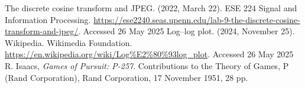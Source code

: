 \documentclass[11pt, twocolumn]{article}
\begin{document}
          \begin{thebibliography}{99}
             The discrete cosine transform and JPEG. (2022, March 22). ESE 224 Signal and Information Processing. \url{https://ese2240.seas.upenn.edu/lab-9-the-discrete-cosine-transform-and-jpeg/}. Accessed 26 May 2025
             Log–log plot. (2024, November 25). Wikipedia. Wikimedia Foundation. \url{https://en.wikipedia.org/wiki/Log%E2%80%93log_plot}. Accessed 26 May 2025
               R. Isaacs, \emph{Games of Pursuit: P-257}. Contributions to the Theory of Games, P (Rand Corporation), Rand Corporation, 17 November 1951, 28 pp.
            \end{thebibliography}
            
\end{document}
